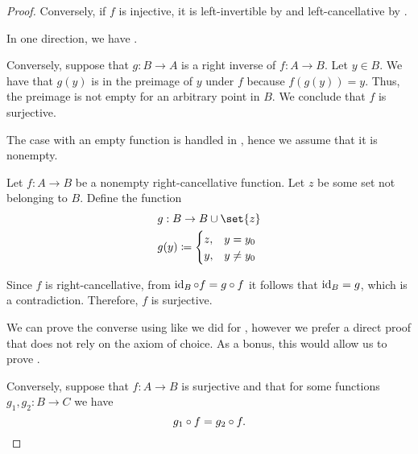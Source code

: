 \begin{proof}
  Conversely, if \( f \) is injective, it is left-invertible by  and left-cancellative by .

   In one direction, we have .

  Conversely, suppose that \( g: B \to A \) is a right inverse of \( f: A \to B \). Let \( y \in B \). We have that \( g(y) \) is in the preimage of \( y \) under \( f \) because \( f(g(y)) = y \). Thus, the preimage is not empty for an arbitrary point in \( B \). We conclude that \( f \) is surjective.

   The case with an empty function is handled in , hence we assume that it is nonempty.

  Let \( f: A \to B \) be a nonempty right-cancellative function. Let \( z \) be some set not belonging to \( B \). Define the function
  \begin{equation*}
    \begin{aligned}
      &g: B \to B \cup \set{ z } \\
      &g(y) \coloneqq \begin{cases}
        z, &y = y_0 \\
        y, &y \neq y_0
      \end{cases}
    \end{aligned}
  \end{equation*}

  Since \( f \) is right-cancellative, from \( \operatorname{id}_B \mathbin \circ f = g \mathbin \circ f \) it follows that \( \operatorname{id}_B = g \), which is a contradiction. Therefore, \( f \) is surjective.

  We can prove the converse using  like we did for , however we prefer a direct proof that does not rely on the axiom of choice. As a bonus, this would allow us to prove .

  Conversely, suppose that \( f: A \to B \) is surjective and that for some functions \( g_1, g_2: B \to C \) we have
  \begin{equation*}
    g_1 \mathbin \circ f = g_2 \mathbin \circ f.
  \end{equation*}


\end{proof}

